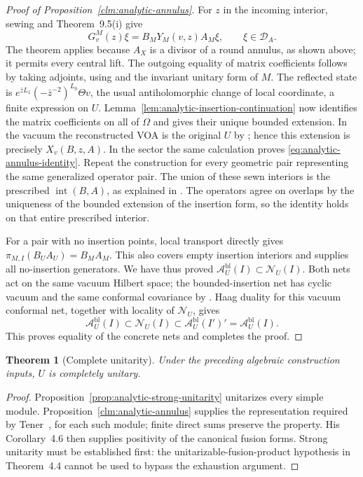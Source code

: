\documentclass[11pt,a4paper]{article}
\newtheorem{theorem}{Theorem}[section]
\theoremstyle{definition}
\begin{document}
\begin{proof}[Proof of Proposition~\ref{clm:analytic-annulus}]
For $z$ in the incoming interior, sewing
\cite[Section~6.2, formula~(76)]{HTNet} and Theorem~9.5(i) give
\[
 G_v^M(z)\xi=B_MY_M(v,z)A_M\xi,
 \qquad \xi\in\mathcal D_A.
\]
The theorem applies because $A_X$ is a divisor of a round annulus,
as shown above; it permits every central lift.  The outgoing equality
of matrix coefficients follows by taking adjoints, using
\cite[Proposition~6.19 and formula~(81)]{HTNet} and the invariant
unitary form of $M$.  The reflected state is
$e^{\bar zL_1}(-\bar z^{-2})^{L_0}\Theta v$, the usual
antiholomorphic change of local coordinate, a finite expression on $U$.
Lemma~\ref{lem:analytic-insertion-continuation} now identifies the
matrix coefficients on all of $\Omega$ and gives their unique bounded
extension.  In the vacuum the reconstructed VOA is the original $U$
by \cite[Theorem~8.9]{HTNet}; hence this extension is precisely
$X_v(B,z,A)$.  In the sector the same calculation proves
\eqref{eq:analytic-annulus-identity}.
Repeat the construction for every geometric pair representing the
same generalized operator pair.  The union of these sewn interiors
is the prescribed $\operatorname{int}(B,A)$, as explained in
\cite[proof of Theorem~4.28]{TenFields}.  The operators agree on
overlaps by the uniqueness of the bounded extension of the insertion
form, so the identity holds on that entire prescribed interior.

For a pair with no insertion points, local transport directly gives
$\pi_{M,I}(B_UA_U)=B_MA_M$.  This also covers empty insertion
interiors and supplies all no-insertion generators.  We have thus
proved $\mathcal A_U^{\mathrm{bl}}(I)\subset\mathcal N_U(I)$.
Both nets act on the same vacuum Hilbert space; the bounded-insertion
net has cyclic vacuum and the same conformal covariance by
\cite[Proposition~4.13]{TenFields}.  Haag duality for this vacuum
conformal net, together with locality of $\mathcal N_U$, gives
\[
 \mathcal A_U^{\mathrm{bl}}(I)\subset\mathcal N_U(I)
 \subset\mathcal A_U^{\mathrm{bl}}(I')'
 =\mathcal A_U^{\mathrm{bl}}(I).
\]
This proves equality of the concrete nets and completes the proof.
\end{proof}

\begin{theorem}[Complete unitarity]
\label{thm:analytic-complete-unitarity}
Under the preceding algebraic construction inputs, $U$ is completely
unitary.
\end{theorem}
\begin{proof}
Proposition~\ref{prop:analytic-strong-unitarity} unitarizes every simple
module.  Proposition~\ref{clm:analytic-annulus} supplies the representation
required by
Tener~\cite[Definition~2.18]{TenFusion}, for each such module; finite direct sums
preserve the property.  His Corollary~4.6 then supplies positivity of
the canonical fusion forms.  Strong unitarity must be established first:
the unitarizable-fusion-product hypothesis in Theorem~4.4 cannot be used
to bypass the exhaustion argument.
\end{proof}
\end{document}
